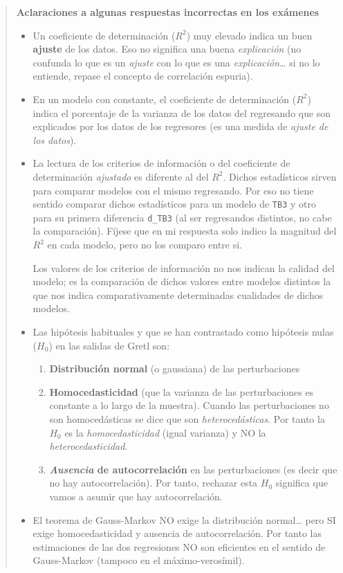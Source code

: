 \documentclass[10pt]{article}
\begin{document}
\begin{quote}
\textbf{Aclaraciones a algunas respuestas incorrectas en los exámenes}

\begin{itemize}
\item Un coeficiente de determinación (\(R^2\)) muy elevado indica un buen
\textbf{ajuste} de los datos. Eso no significa una buena \emph{explicación} (no
confunda lo que es un \emph{ajuste} con lo que es una \emph{explicación}\ldots{} si
no lo entiende, repase el concepto de correlación espuria).
\item En un modelo con constante, el coeficiente de determinación (\(R^2\))
indica el porcentaje de la varianza de los datos del regresando que
son explicados por los datos de los regresores (es una medida de
\emph{ajuste de los datos}).
\item La lectura de los criterios de información o del coeficiente de
determinación \emph{ajustado} es diferente al del \(R^2\). Dichos
estadísticos sirven para comparar modelos con el mismo
regresando. Por eso no tiene sentido comparar dichos estadísticos
para un modelo de \texttt{TB3} y otro para su primera diferencia \texttt{d\_TB3}
(al ser regresandos distintos, no cabe la comparación). Fíjese que
en mi respuesta solo indico la magnitud del \(R^2\) en cada modelo,
pero no los comparo entre si.

Los valores de los criterios de información no nos indican la
calidad del modelo; es la comparación de dichos valores entre
modelos distintos la que nos indica comparativamente determinadas
cualidades de dichos modelos.

\item Las hipótesis habituales y que se han contrastado como hipótesis
nulas (\(H_0\)) en las salidas de Gretl son:
\begin{enumerate}
\item \textbf{Distribución normal} (o gaussiana) de las perturbaciones
\item \textbf{Homocedasticidad} (que la varianza de las perturbaciones es
constante a lo largo de la muestra). Cuando las perturbaciones no
son homocedásticas se dice que son \emph{heterocedásticas}. Por tanto
la \(H_0\) es la \emph{homocedasticidad} (igual varianza) y NO la
\emph{heterocedasticidad}.
\item \textbf{\emph{Ausencia} de autocorrelación} en las perturbaciones (es decir
que no hay autocorrelación). Por tanto, rechazar esta \(H_0\)
significa que vamos a asumir que hay autocorrelación.
\end{enumerate}
\item El teorema de Gauss-Markov NO exige la distribución normal\ldots{} pero
SI exige homocedasticidad y ausencia de autocorrelación. Por tanto
las estimaciones de las dos regresiones NO son eficientes en el
sentido de Gauss-Markov (tampoco en el máximo-verosímil).
\end{itemize}
\end{quote}
\end{document}
